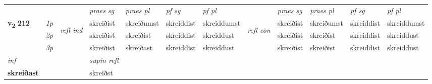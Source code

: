 \begin{longtable}[l]{X>{\footnotesize\itshape}llXXXXlXXXX}
\midrule

 & &   & \textit{praes sg}  & \textit{praes pl}    & \textit{ pf sg} & \textit{pf pl} & & \textit{praes sg}  & \textit{praes pl}    & \textit{pf sg} & \textit{pf pl }  \\ \cmidrule{4-7} \cmidrule{9-12}
 \multirow{2}{*}{{{\textbf{v{\textsubscript{2}}} \Large{\textbf{212}}}}}  & 1p & \multirow{3}{*}{\begin{turn}{90}\textit{refl ind}\end{turn}}  & skreiðist & skreiðumst & skreiddist & skreiddumst & \multirow{3}{*}{\begin{turn}{90}\textit{refl con}\end{turn}}  &skreiðist & skreiðumst & skreiddist & skreiddumst \\*
 & 2p &  & skreiðist & skreiðist & skreiddist & skreiddust & &skreiðist & skreiðist & skreiddist & skreiddust \\*
 & 3p  & & skreiðist & skreiðast & skreiddist & skreiddust & & skreiðist & skreiðist& skreiddist & skreiddust \\*
\cmidrule{4-7} \cmidrule{9-12}

   {\textit{inf}} & &       & \textit{supin refl}  \\*
  {\textbf{skreiðast}} & &       & skreiðst  \\*

\midrule


\end{longtable}
